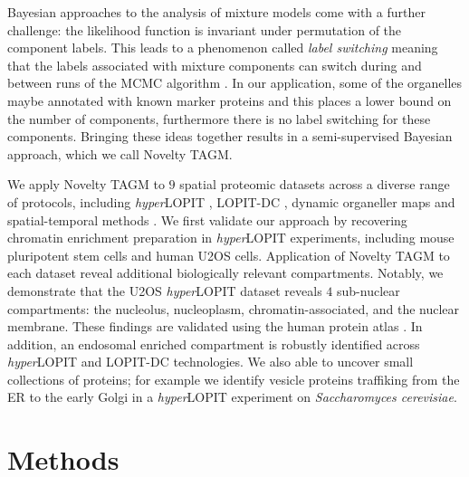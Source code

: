 \documentclass[12pt,english]{article}
\begin{document}
Bayesian approaches to the analysis of mixture models come with a further challenge: the likelihood function is invariant under permutation of the component labels. This leads to a phenomenon called \textit{label switching} meaning that the labels associated with mixture components can switch during and between runs of the MCMC algorithm \citep{Richardson::1997}. In our application, some of the organelles maybe annotated with known marker proteins and this places a lower bound on the number of components, furthermore there is no label switching for these components. Bringing these ideas together results in a semi-supervised Bayesian approach, which we call Novelty TAGM.

We apply Novelty TAGM to $9$ spatial proteomic datasets across a diverse range of protocols, including \textit{hyper}LOPIT \citep{hyper, Mulvey:2017}, LOPIT-DC \citep{DC:2018}, dynamic organeller maps \citep{Itzhak:2016} and spatial-temporal methods \citep{Jean_Beltran:2016}. We first validate our approach by recovering chromatin enrichment preparation in \textit{hyper}LOPIT experiments, including mouse pluripotent stem cells and human U2OS cells. Application of Novelty TAGM to each dataset reveal additional biologically relevant compartments. Notably, we demonstrate that the U2OS \textit{hyper}LOPIT dataset reveals $4$ sub-nuclear compartments: the nucleolus,  nucleoplasm, chromatin-associated, and the nuclear membrane. These findings are validated using the human protein atlas \citep{Thul:2017}. In addition, an endosomal enriched compartment is robustly identified across \textit{hyper}LOPIT and LOPIT-DC technologies. We also able to uncover small collections of proteins; for example we identify vesicle proteins traffiking from the ER to the early Golgi in a \textit{hyper}LOPIT experiment on \textit{Saccharomyces cerevisiae}.


\section{Methods}
\end{document}
